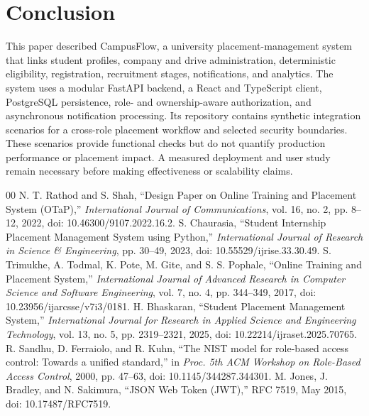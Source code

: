 \documentclass[conference,final]{IEEEtran}
\begin{document}
\section{Conclusion}
This paper described CampusFlow, a university placement-management system that links student profiles, company and drive administration, deterministic eligibility, registration, recruitment stages, notifications, and analytics. The system uses a modular FastAPI backend, a React and TypeScript client, PostgreSQL persistence, role- and ownership-aware authorization, and asynchronous notification processing. Its repository contains synthetic integration scenarios for a cross-role placement workflow and selected security boundaries. These scenarios provide functional checks but do not quantify production performance or placement impact. A measured deployment and user study remain necessary before making effectiveness or scalability claims.

\begin{thebibliography}{00}
N. T. Rathod and S. Shah, ``Design Paper on Online Training and Placement System (OTaP),'' \emph{International Journal of Communications}, vol. 16, no. 2, pp. 8--12, 2022, doi: 10.46300/9107.2022.16.2.
S. Chaurasia, ``Student Internship Placement Management System using Python,'' \emph{International Journal of Research in Science \& Engineering}, pp. 30--49, 2023, doi: 10.55529/ijrise.33.30.49.
S. Trimukhe, A. Todmal, K. Pote, M. Gite, and S. S. Pophale, ``Online Training and Placement System,'' \emph{International Journal of Advanced Research in Computer Science and Software Engineering}, vol. 7, no. 4, pp. 344--349, 2017, doi: 10.23956/ijarcsse/v7i3/0181.
H. Bhaskaran, ``Student Placement Management System,'' \emph{International Journal for Research in Applied Science and Engineering Technology}, vol. 13, no. 5, pp. 2319--2321, 2025, doi: 10.22214/ijraset.2025.70765.
R. Sandhu, D. Ferraiolo, and R. Kuhn, ``The NIST model for role-based access control: Towards a unified standard,'' in \emph{Proc. 5th ACM Workshop on Role-Based Access Control}, 2000, pp. 47--63, doi: 10.1145/344287.344301.
M. Jones, J. Bradley, and N. Sakimura, ``JSON Web Token (JWT),'' RFC 7519, May 2015, doi: 10.17487/RFC7519.
\end{thebibliography}
\end{document}
